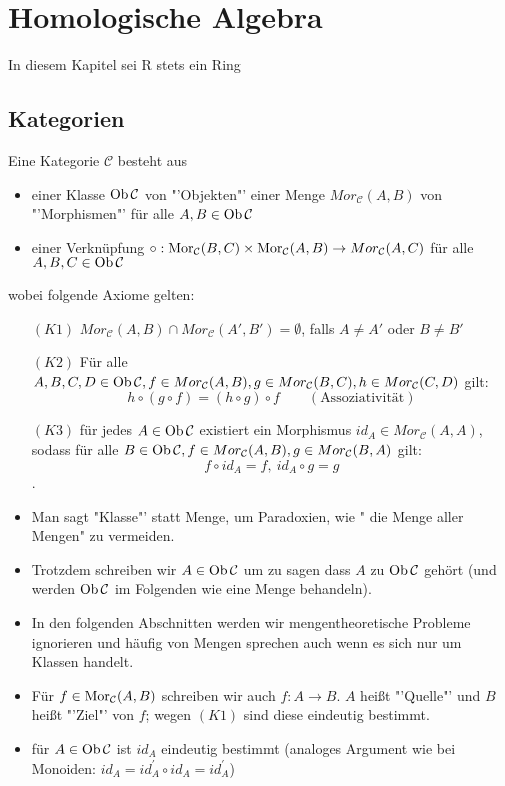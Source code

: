 \newpage
\section{Homologische Algebra}
\begin{center}
	In diesem Kapitel sei R stets ein Ring
\end{center}
\setcounter{subsection}{3}
\subsection{Kategorien}
\begin{df}
	Eine Kategorie $ \mathcal{C} $ besteht aus 
	\begin{itemize}
		\item einer Klasse $\text{Ob}\,\mathcal{C}$ von "'Objekten"'
			einer Menge $Mor_{\mathcal{C}}(A,B) $ von "'Morphismen"' für alle $A,B \in \text{Ob}\,\mathcal{C}$
		\item einer Verknüpfung $\circ : \text{Mor}_{\mathcal{C}}(B,C) \times \text{Mor}_{\mathcal{C}}(A,B) \to Mor_{\mathcal{C}}(A,C) $ für alle $A,B,C \in \text{Ob}\,\mathcal{C}$
	\end{itemize}
	wobei folgende Axiome gelten:
	\begin{enumerate}
		\item[$(K1)$] $Mor_{\mathcal{C}}(A,B) \cap Mor_{\mathcal{C}}(A',B') = \emptyset$, falls $A \neq A'$ oder $B \neq B'$
		\item[$(K2)$] Für alle $A,B,C,D \in \text{Ob}\,\mathcal{C}, f \in Mor_{\mathcal{C}}(A,B), g \in Mor_{\mathcal{C}}(B,C), h \in Mor_{\mathcal{C}}(C,D)$ gilt:
		$$ h \circ (g \circ f) = (h \circ g) \circ f \qquad (\text{Assoziativität})$$
		\item[$(K3)$] für jedes $ A \in \text{Ob}\,\mathcal{C}$ existiert ein Morphismus $id_A \in Mor_{\mathcal{C}}(A,A)$, sodass für alle $B \in \text{Ob}\,\mathcal{C}, f \in Mor_{\mathcal{C}}(A,B), g \in Mor_{\mathcal{C}}(B,A)$ gilt: $$f \circ id_A = f, \ id_A \circ g = g $$.
	\end{enumerate}
\end{df}
\begin{anm}
	\begin{itemize}
		\item Man sagt "Klasse"' statt Menge, um Paradoxien, wie " die Menge aller Mengen" zu vermeiden.
		\item Trotzdem schreiben wir $A \in \text{Ob}\,\mathcal{C}$ um zu sagen dass $A$ zu $\text{Ob}\,\mathcal{C}$ gehört (und werden $\text{Ob}\,\mathcal{C}$ im Folgenden wie eine Menge behandeln).
		\item In den folgenden Abschnitten werden wir mengentheoretische Probleme ignorieren und häufig von Mengen sprechen auch wenn es sich nur um Klassen handelt.
		\item Für $f \in \text{Mor}_{\mathcal{C}}(A,B)$ schreiben wir auch $f: A \to B $. $A$ heißt "'Quelle"' und $B$ heißt "'Ziel"' von $f$; wegen $(K1)$ sind diese eindeutig bestimmt.
		\item für $A \in \text{Ob}\,\mathcal{C}$ ist $id_A$ eindeutig bestimmt (analoges Argument wie bei Monoiden: $id_A = id_A^{'} \circ id_A = id_A^{'}$)
	\end{itemize}
\end{anm}
